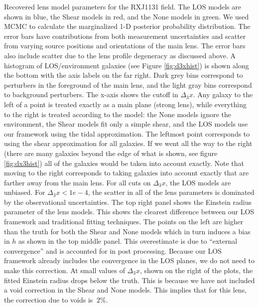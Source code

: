 \label{fig:RXJ1131} Recovered lens model parameters for the RXJ1131 field. The LOS models are shown in blue, the Shear models in red, and the None models in green. We used MCMC to calculate the marginalized 1-D posterior probability distribution. The error bars have contributions from both measurement uncertainties and scatter from varying source positions and orientations of the main lens. The error bars also include scatter due to the lens profile degeneracy as discussed above. A histogram of LOS/environment galaxies (see Figure \ref{fig:d3xhist}) is shown along the bottom with the axis labels on the far right. Dark grey bins correspond to perturbers in the foreground of the main lens, and the light gray bins correspond to background perturbers. The x-axis shows the cutoff in $\Delta_3 x$. Any galaxy to the left of a point is treated exactly as a main plane (strong lens), while everything to the right is treated according to the model: the None models ignore the environment, the Shear models fit only a simple shear, and the LOS models use our framework using the tidal approximation. The leftmost point corresponds to using the shear approximation for all galaxies. If we went all the way to the right (there are many galaxies beyond the edge of what is shown, see figure \ref{fig:dx3hist}) all of the galaxies would be taken into account exactly. Note that moving to the right corresponds to taking galaxies into account exactly that are farther away from the main lens. For all cuts on $\Delta_3 x$, the LOS models are unbiased. For $\Delta_3 x < 1e-4$, the scatter in all of the lens parameters is dominated by the observational uncertainties. The top right panel shows the Einstein radius parameter of the lens models. This shows the clearest difference between our LOS framework and traditional fitting techniques. The points on the left are higher than the truth for both the Shear and None models which in turn induces a bias in $h$ as shown in the top middle panel. This overestimate is due to ``external convergence'' and is accounted for in post processing. Because our LOS framework already includes the convergence in the LOS planes, we do not need to make this correction. At small values of $\Delta_3 x$, shown on the right of the plots, the fitted Einstein radius drops below the truth. This is because we have not included a void correction in the Shear and None models. This implies that for this lens, the correction due to voids is $~2\%$.